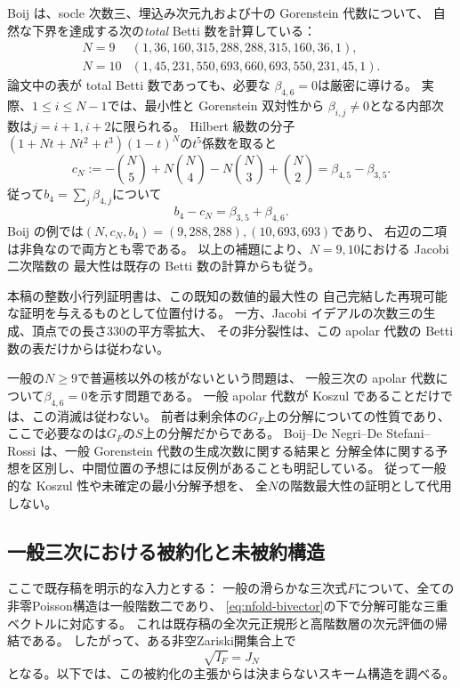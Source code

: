 \begin{remark}
Boij \cite[Remark~6, pp.~163--164]{NFMBoijBetti}
は、socle 次数三、埋込み次元九および十の Gorenstein 代数について、
自然な下界を達成する次の\emph{total} Betti 数を計算している：
\[
\begin{array}{c|l}
 N=9 &(1,36,160,315,288,288,315,160,36,1),\\
 N=10&(1,45,231,550,693,660,693,550,231,45,1).
\end{array}
\]
論文中の表が total Betti 数であっても、必要な
$\beta_{4,6}=0$は厳密に導ける。
実際、$1\le i\le N-1$では、最小性と Gorenstein 双対性から
$\beta_{i,j}\ne0$となる内部次数は$j=i+1,i+2$に限られる。
Hilbert 級数の分子
$(1+Nt+Nt^2+t^3)(1-t)^N$の$t^5$係数を取ると
\[
 c_N:=-\binom N5+N\binom N4-N\binom N3+\binom N2
       =\beta_{4,5}-\beta_{3,5}.
\]
従って$b_4=\sum_j\beta_{4,j}$について
\[
 b_4-c_N=\beta_{3,5}+\beta_{4,6}.
\]
Boij の例では$(N,c_N,b_4)=(9,288,288),(10,693,693)$であり、
右辺の二項は非負なので両方とも零である。
以上の補題により、$N=9,10$における Jacobi 二次階数の
最大性は既存の Betti 数の計算からも従う。

本稿の整数小行列証明書は、この既知の数値的最大性の
自己完結した再現可能な証明を与えるものとして位置付ける。
一方、Jacobi イデアルの次数三の生成、頂点での長さ330の平方零拡大、
その非分裂性は、この apolar 代数の Betti 数の表だけからは従わない。
\end{remark}

\begin{remark}[全次元の階数問題を調べる際の区別]
一般の$N\ge9$で普遍核以外の核がないという問題は、
一般三次の apolar 代数について$\beta_{4,6}=0$を示す問題である。
一般 apolar 代数が Koszul であることだけでは、この消滅は従わない。
前者は剰余体の$G_F$上の分解についての性質であり、
ここで必要なのは$G_F$の$S$上の分解だからである。
Boij--De Negri--De Stefani--Rossi
\cite[Introduction, pp.~2--3]{BoijDeNegriDeStefaniRossiRate}
は、一般 Gorenstein 代数の生成次数に関する結果と
分解全体に関する予想を区別し、中間位置の予想には反例があることも明記している。
従って一般的な Koszul 性や未確定の最小分解予想を、
全$N$の階数最大性の証明として代用しない。
\end{remark}

\subsection{一般三次における被約化と未被約構造}
ここで既存稿\cite[系\texttt{cor:pg-generic}]{NCCubicA}を明示的な入力とする：
一般の滑らかな三次式$F$について、全ての非零Poisson構造は一般階数二であり、
\eqref{eq:nfold-bivector}の下で分解可能な三重ベクトルに対応する。
これは既存稿の全次元正規形と高階数層の次元評価の帰結である。
したがって、ある非空Zariski開集合上で
\begin{equation}\label{eq:nfold-reduced-cone}
 \sqrt{I_F}=J_N
\end{equation}
となる。以下では、この被約化の主張からは決まらないスキーム構造を調べる。

